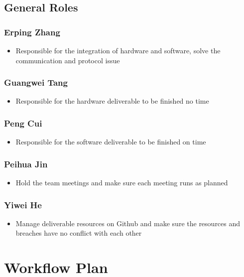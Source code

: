 \documentclass{article}
\begin{document}
\begin{large}
\begin{itemize}
\end{itemize}
\subsection{General Roles}
\subsubsection{Erping Zhang}
\begin{itemize}
    \item Responsible for the integration of hardware and software, solve the communication and protocol issue
\end{itemize}
\subsubsection{Guangwei Tang}
\begin{itemize}
    \item Responsible for the hardware deliverable to be finished no time
\end{itemize}
\subsubsection{Peng Cui}
\begin{itemize}
    \item Responsible for the software deliverable to be finished on time
\end{itemize}
\subsubsection{Peihua Jin}
\begin{itemize}
    \item Hold the team meetings and make sure each meeting runs as planned
\end{itemize}
\subsubsection{Yiwei He}
\begin{itemize}
    \item Manage deliverable resources on Github and make sure the resources and breaches have no conflict with each other
\end{itemize}
	









\section{Workflow Plan}


\end{large}
\end{document}

